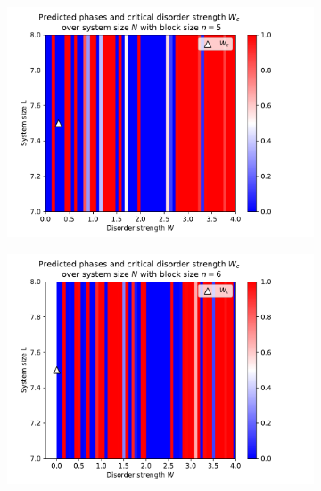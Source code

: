 \documentclass[reprint,amsmath,amssymb,aps,prb]{revtex4-2}
\begin{document}
\begin{center}
\begin{figure}[H]
\begin{subfigure}[c]{0.4\textwidth}
			\includegraphics[width=\textwidth]{../results/Wc/n5_Wc_N_dependency.pdf}
		\end{subfigure}
		\begin{subfigure}[c]{0.4\textwidth}
			\includegraphics[width=\textwidth]{../results/Wc/n6_Wc_N_dependency.pdf}
		\end{subfigure}
		\begin{subfigure}[c]{0.4\textwidth}

\end{subfigure}
\end{figure}
\end{center}
\end{document}
